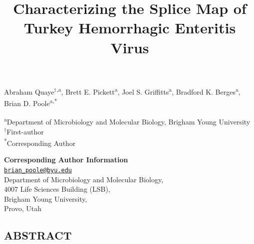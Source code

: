 \documentclass[
]{article}
\title{Characterizing the Splice Map of Turkey Hemorrhagic Enteritis
Virus}
\author{}
\date{\vspace{-2.5em}}
\begin{document}
\maketitle

\captionsetup[table]{labelformat=empty}

\vspace{5mm}

Abraham Quaye\({^\dagger}\)\textsuperscript{,a}, Brett E.
Pickett\textsuperscript{a}, Joel S. Griffitts\textsuperscript{a},
Bradford K. Berges\textsuperscript{a}, Brian D.
Poole\textsuperscript{a,*}

\vspace{5mm}

\textsuperscript{a}Department of Microbiology and Molecular Biology,
Brigham Young University\\
\({^\dagger}\)First-author\\
\textsuperscript{*}Corresponding Author

\vspace{5mm}

\textbf{Corresponding Author Information}\\
\href{mailto:brian_poole@byu.edu}{\nolinkurl{brian\_poole@byu.edu}}\\
Department of Microbiology and Molecular Biology,\\
4007 Life Sciences Building (LSB),\\
Brigham Young University,\\
Provo, Utah\\
\newpage

\subsection{ABSTRACT}\label{abstract}
\end{document}
